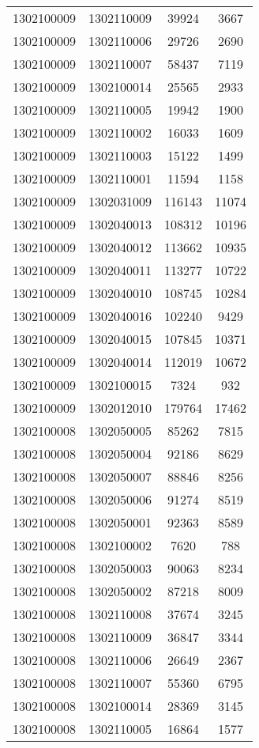 \begin{longtable}{llcc}
1302100009 & 1302110009 & 39924 & 3667\\
1302100009 & 1302110006 & 29726 & 2690\\
1302100009 & 1302110007 & 58437 & 7119\\
1302100009 & 1302100014 & 25565 & 2933\\
1302100009 & 1302110005 & 19942 & 1900\\
1302100009 & 1302110002 & 16033 & 1609\\
1302100009 & 1302110003 & 15122 & 1499\\
1302100009 & 1302110001 & 11594 & 1158\\
1302100009 & 1302031009 & 116143 & 11074\\
1302100009 & 1302040013 & 108312 & 10196\\
1302100009 & 1302040012 & 113662 & 10935\\
1302100009 & 1302040011 & 113277 & 10722\\
1302100009 & 1302040010 & 108745 & 10284\\
1302100009 & 1302040016 & 102240 & 9429\\
1302100009 & 1302040015 & 107845 & 10371\\
1302100009 & 1302040014 & 112019 & 10672\\
1302100009 & 1302100015 & 7324 & 932\\
1302100009 & 1302012010 & 179764 & 17462\\
1302100008 & 1302050005 & 85262 & 7815\\
1302100008 & 1302050004 & 92186 & 8629\\
1302100008 & 1302050007 & 88846 & 8256\\
1302100008 & 1302050006 & 91274 & 8519\\
1302100008 & 1302050001 & 92363 & 8589\\
1302100008 & 1302100002 & 7620 & 788\\
1302100008 & 1302050003 & 90063 & 8234\\
1302100008 & 1302050002 & 87218 & 8009\\
1302100008 & 1302110008 & 37674 & 3245\\
1302100008 & 1302110009 & 36847 & 3344\\
1302100008 & 1302110006 & 26649 & 2367\\
1302100008 & 1302110007 & 55360 & 6795\\
1302100008 & 1302100014 & 28369 & 3145\\
1302100008 & 1302110005 & 16864 & 1577\\

\end{longtable}

